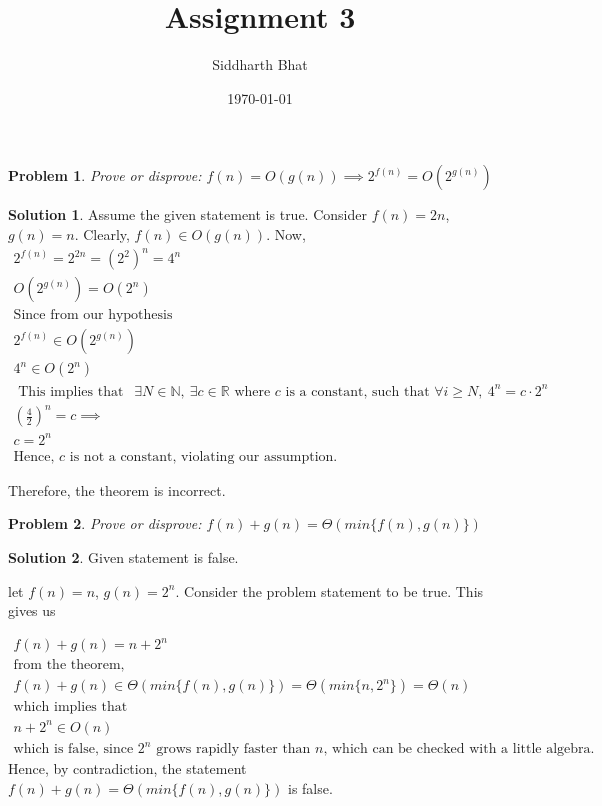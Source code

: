 \documentclass{article}
\newtheorem{problem}{Problem}
\theoremstyle{definition}
\newtheorem*{solution}{Solution}
\begin{document}
\title{Assignment 3}
\author{Siddharth Bhat}
\date{\today}
\maketitle

\begin{problem}
Prove or disprove: $f(n) = O(g(n)) \implies 2^{f(n)} = O(2^{g(n)})$
\end{problem}
\begin{solution}
	Assume the given statement is true. 
	Consider $f(n) = 2n$, $g(n) = n$. Clearly, $f(n) \in O(g(n))$.
	Now,
	\begin{gather*}
		2^{f(n)} = 2^{2n}= (2^2)^n = 4^n \\
		O(2^{g(n)}) = O(2^n) \\
		\text{Since from our hypothesis} \\
		2^{f(n)} \in O(2^{g(n)}) \\
		4^n \in O(2^n) \\
		\text{ This implies that } \ \ \exists N \in \mathbb N,\ \exists c \in \mathbb R \text{ where $c$ is a constant, such that }
		\forall i \geq N, \ 4^n = c \cdot 2^n \\
		\left ( \frac{4}{2} \right ) ^n = c \implies \\
		c = 2^n \\
		\text{Hence, $c$ is not a constant, violating our assumption.}
	\end{gather*}
	
	Therefore, the theorem is incorrect.
\end{solution}

\begin{problem}
Prove or disprove: $f(n) + g(n) = \Theta(min \{ f(n), g(n) \})$
\end{problem}
\begin{solution}
	Given statement is false.
	
	let $f(n) = n$, $g(n) = 2^n$. Consider the problem statement to be
	true. This gives us
	
	\begin{gather*}
		f(n) + g(n) = n + 2^n \\
		\text{from the theorem, } \\
		f(n) + g(n) \in \Theta(min \{ f(n), g(n) \}) = \Theta(min \{n, 2^n \}) = \Theta(n) \\
		\text{which implies that} \\
		n + 2^n \in O(n) \\
		\text{which is false, since $2^n$ grows rapidly faster than $n$, which can
		be checked with a little algebra.}
	\end{gather*}
	Hence, by contradiction, the statement $f(n) + g(n) = \Theta(min \{ f(n), g(n) \})$ is false.
\end{solution}
\end{document}
